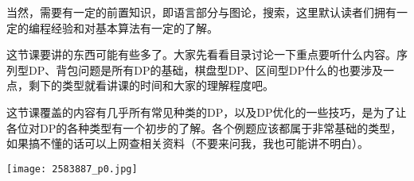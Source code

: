 当然，需要有一定的前置知识，即语言部分与图论，搜索，这里默认读者们拥有一定的编程经验和对基本算法有一定的了解。

这节课要讲的东西可能有些多了。大家先看看目录讨论一下重点要听什么内容。序列型DP、背包问题是所有DP的基础，棋盘型DP、区间型DP什么的也要涉及一点，剩下的类型就看讲课的时间和大家的理解程度吧。

这节课覆盖的内容有几乎所有常见种类的DP，以及DP优化的一些技巧，是为了让各位对DP的各种类型有一个初步的了解。各个例题应该都属于非常基础的类型，如果搞不懂的话可以上网查相关资料（不要来问我，我也可能讲不明白）。

\begin{center}\texttt{[image: 2583887\_p0.jpg]}\end{center}
\newpage
